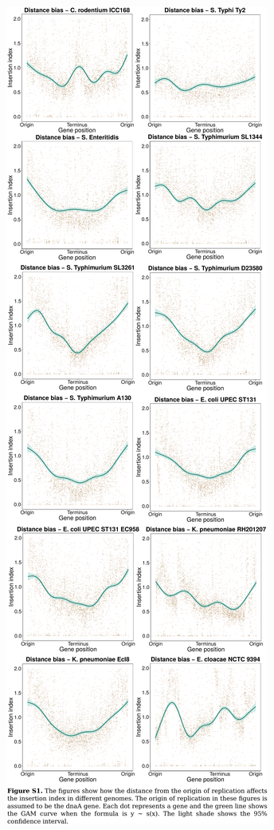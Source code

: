 \documentclass{article}
\newcommand{\Newpage}{\end{preview}\begin{preview}}
\begin{document}
\begin{preview}
\includegraphics{suppl1.pdf}
\Newpage

\end{preview}
\end{document}
